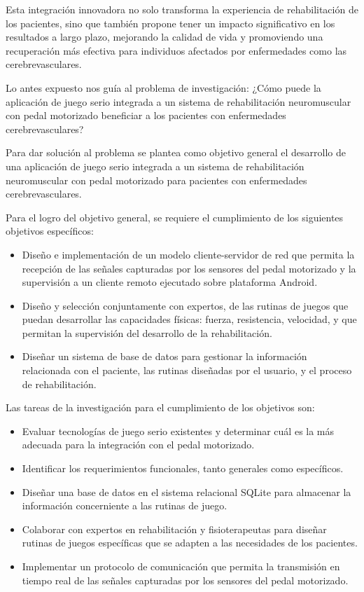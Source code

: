 \begin{introduction}
    Esta integración innovadora no solo transforma la experiencia de rehabilitación de los pacientes, sino que también propone tener un impacto significativo en los resultados a largo plazo, mejorando la calidad de vida y promoviendo una recuperación más efectiva para individuos afectados por enfermedades como las cerebrevasculares.

    Lo antes expuesto nos guía al problema de investigación: ¿Cómo puede la aplicación de juego serio integrada a un sistema de rehabilitación neuromuscular con pedal motorizado beneficiar a los pacientes con enfermedades cerebrevasculares?

    Para dar solución al problema se plantea como objetivo general el desarrollo de una aplicación de juego serio integrada a un sistema de rehabilitación neuromuscular con pedal motorizado para pacientes con enfermedades cerebrevasculares.
    
    Para el logro del objetivo general, se requiere el cumplimiento de los siguientes objetivos específicos:

    \begin{itemize}
        \item Diseño e implementación de un modelo cliente-servidor de red que permita la recepción de las señales capturadas por los sensores del pedal motorizado y la supervisión a un cliente remoto ejecutado sobre plataforma Android.
        \item  Diseño y selección conjuntamente con expertos, de las rutinas de juegos que puedan desarrollar las capacidades físicas: fuerza, resistencia, velocidad, y que permitan la supervisión del desarrollo de la rehabilitación.
        \item Diseñar un sistema de base de datos para gestionar la información relacionada con el paciente, las rutinas diseñadas por el usuario, y el proceso de rehabilitación.
    \end{itemize}

    Las tareas de la investigación para el cumplimiento de los objetivos son:
    \begin{itemize}
        \item Evaluar tecnologías de juego serio existentes y determinar cuál es la más adecuada para la integración con el pedal motorizado.
        \item Identificar los requerimientos funcionales, tanto generales como específicos.
        \item Diseñar una base de datos en el sistema relacional SQLite para almacenar la información concerniente a las rutinas de juego. 
        \item Colaborar con expertos en rehabilitación y fisioterapeutas para diseñar rutinas de juegos específicas que se adapten a las necesidades de los pacientes.
        \item Implementar un protocolo de comunicación que permita la transmisión en tiempo real de las señales capturadas por los sensores del pedal motorizado. 
    \end{itemize}


\end{introduction}
